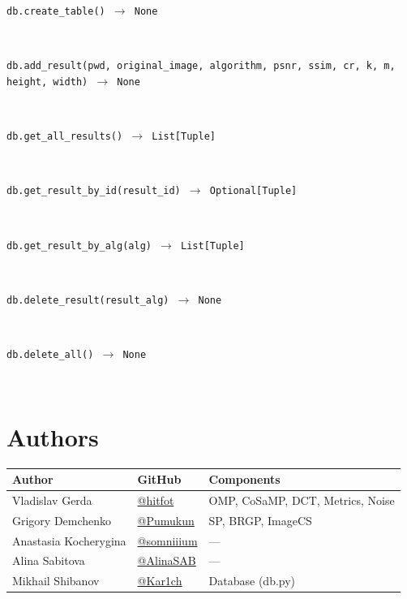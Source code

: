 \documentclass[12pt,a4paper]{article}
\newcommand{\cs}[1]{\texttt{#1}}          %
\begin{document}
\begin{description}
  \item[\cs{db.create\_table() $\to$ None}] ~
  \item[\cs{db.add\_result(pwd, original\_image, algorithm, psnr, ssim, cr, k, m, height, width) $\to$ None}] ~
  \item[\cs{db.get\_all\_results() $\to$ List[Tuple]}] ~
  \item[\cs{db.get\_result\_by\_id(result\_id) $\to$ Optional[Tuple]}] ~
  \item[\cs{db.get\_result\_by\_alg(alg) $\to$ List[Tuple]}] ~
  \item[\cs{db.delete\_result(result\_alg) $\to$ None}] ~
  \item[\cs{db.delete\_all() $\to$ None}] ~
\end{description}

\section{Authors}

\begin{center}
\begin{tabular}{lll}
  \toprule
  Author & GitHub & Components \\
  \midrule
  Vladislav Gerda       & \href{https://github.com/hitfot}{@hitfot}       & OMP, CoSaMP, DCT, Metrics, Noise \\
  Grigory Demchenko     & \href{https://github.com/Pumukun}{@Pumukun}     & SP, BRGP, ImageCS \\
  Anastasia Kocherygina & \href{https://github.com/somniiium}{@somniiium} & --- \\
  Alina Sabitova        & \href{https://github.com/AlinaSAB}{@AlinaSAB}   & --- \\
  Mikhail Shibanov      & \href{https://github.com/Kar1ch}{@Kar1ch}       & Database (db.py) \\
  \bottomrule
\end{tabular}
\end{center}
\end{document}
